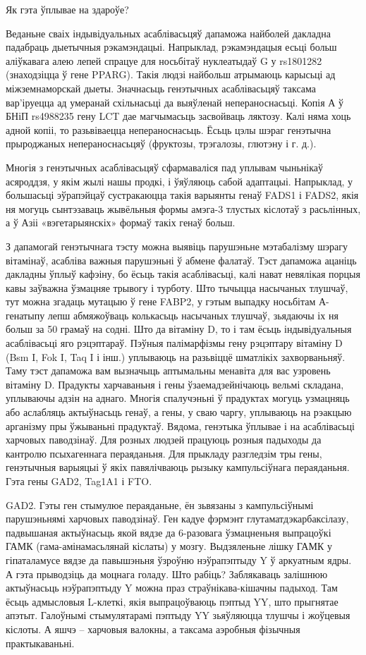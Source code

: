 Як гэта ўплывае на здароўе?

Веданьне сваіх індывідуальных асаблівасьцяў дапаможа найболей дакладна падабраць дыетычныя рэкамэндацыі. Напрыклад, рэкамэндацыя есьці больш аліўкавага алею лепей спрацуе для носьбітаў нуклеатыдаў G у rs1801282 (знаходзіцца ў гене PPARG). Такія людзі найбольш атрымаюць карысьці ад міжземнаморскай дыеты. Значнасьць генэтычных асаблівасьцяў таксама вар'іруецца ад умеранай схільнасьці да выяўленай непераноснасьці. Копія А ў БНіП rs4988235 гену LCT дае магчымасьць засвойваць ляктозу. Калі няма хоць адной копіі, то разьвіваецца непераноснасьць. Ёсьць цэлы шэраг генэтычна прыроджаных непераноснасьцяў (фруктозы, трэгалозы, глютэну і г. д.).

Многія з генэтычных асаблівасьцяў сфармаваліся пад уплывам чыньнікаў асяроддзя, у якім жылі нашы продкі, і ўяўляюць сабой адаптацыі. Напрыклад, у большасьці эўрапэйцаў сустракаюцца такія варыянты генаў FADS1 і FADS2, якія ня могуць сынтэзаваць жывёльныя формы амэга-3 тлустых кіслотаў з расьлінных, а ў Азіі «вэгетарыянскіх» формаў такіх генаў больш.

З дапамогай генэтычнага тэсту можна выявіць парушэньне мэтабалізму шэрагу вітамінаў, асабліва важныя парушэньні ў абмене фалатаў. Тэст дапаможа ацаніць дакладны ўплыў кафэіну, бо ёсьць такія асаблівасьці, калі нават невялікая порцыя кавы заўважна ўзмацняе трывогу і турботу. Што тычыцца насычаных тлушчаў, тут можна згадаць мутацыю ў гене FABP2, у гэтым выпадку носьбітам А-генатыпу лепш абмяжоўваць колькасьць насычаных тлушчаў, зьядаючы іх ня больш за 50 грамаў на содні. Што да вітаміну D, то і там ёсьць індывідуальныя асаблівасьці яго рэцэптараў. Пэўныя палімарфізмы гену рэцэптару вітаміну D (Bsm I, Fok I, Taq I і інш.) уплываюць на разьвіццё шматлікіх захворваньняў. Таму тэст дапаможа вам вызначыць аптымальны менавіта для вас узровень вітаміну D. Прадукты харчаваньня і гены ўзаемадзейнічаюць вельмі складана, уплываючы адзін на аднаго. Многія спалучэньні ў прадуктах могуць узмацняць або аслабляць актыўнасьць генаў, а гены, у сваю чаргу, уплываюць на рэакцыю арганізму пры ўжываньні прадуктаў.
Вядома, генэтыка ўплывае і на асаблівасьці харчовых паводзінаў. Для розных людзей працуюць розныя падыходы да кантролю псыхагеннага пераяданьня. Для прыкладу разгледзім тры гены, генэтычныя варыяцыі ў якіх павялічваюць рызыку кампульсіўнага пераяданьня. Гэта гены GAD2, Tag1A1 і FTO.

GAD2.
Гэты ген стымулюе пераяданьне, ён зьвязаны з кампульсіўнымі парушэньнямі харчовых паводзінаў. Ген кадуе фэрмэнт глутаматдэкарбаксілазу, падвышаная актыўнасьць якой вядзе да 6-разовага ўзмацненьня выпрацоўкі ГАМК (гама-амінамасьлянай кіслаты) у мозгу. Выдзяленьне лішку ГАМК у гіпаталамусе вядзе да павышэньня ўзроўню нэўрапэптыду Y ў аркуатным ядры. А гэта прыводзіць да моцнага голаду. Што рабіць? Заблякаваць залішнюю актыўнасьць нэўрапэптыду Y можна праз страўнікава-кішачны падыход. Там ёсьць адмысловыя L-клеткі, якія выпрацоўваюць пэптыд YY, што прыгнятае апэтыт. Галоўнымі стымулятарамі пэптыду YY зьяўляюцца тлушчы і жоўцевыя кіслоты. А яшчэ – харчовыя валокны, а таксама аэробныя фізычныя практыкаваньні.

